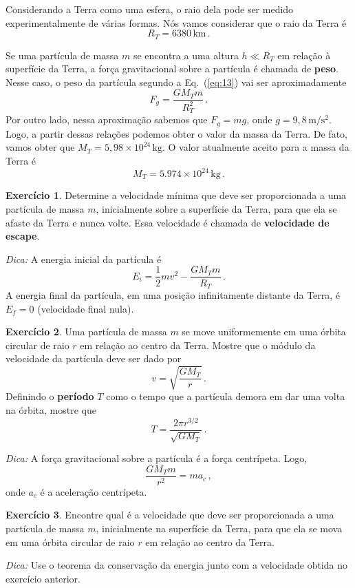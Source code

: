 \documentclass[12pt,a4paper]{article}
\theoremstyle{definition}
\newtheorem{ex}{Exercício}[section]
\begin{document}
Considerando a Terra como uma esfera, o raio dela pode ser medido
experimentalmente de várias formas. Nós vamos considerar que o raio da
Terra é
$$R_T=6380\,\mathrm{km}\,.$$

Se uma partícula de massa $m$ se encontra a uma altura $h\ll R_T$ em
relação à superfície da Terra, a força gravitacional sobre a partícula
é chamada de \textbf{peso}. Nesse caso, o peso da partícula segundo a
Eq.~(\ref{eq:13}) vai ser aproximadamente
$$F_g=\frac{GM_Tm}{R_T^2}\,.$$
Por outro lado, nessa aproximação sabemos que $F_g=mg$, onde
$g=9{,}8\,\mathrm{m}/\mathrm{s}^2$. Logo, a partir dessas relações
podemos obter o valor da massa da Terra. De fato, vamos obter que
$M_T=5{,}98\times 10^{24}\,\mathrm{kg}$. O valor atualmente aceito
para a massa da Terra é
$$M_T=5.974\times 10^{24}\,\mathrm{kg}\,.$$

\begin{ex}
  Determine a velocidade mí\-ni\-ma que deve ser proporcionada a uma
  partícula de massa $m$, inicialmente sobre a superfície da Terra,
  para que ela se afaste da Terra e nunca volte. Essa velocidade é
  chamada de \textbf{velocidade de escape}.

  \noindent\textit{Dica:} A energia inicial da partícula é
  $$E_i=\frac{1}{2}mv^2-\frac{GM_Tm}{R_T}\,.$$
  A energia final da partícula, em uma posição infinitamente distante
  da Terra, é $E_f=0$ (velocidade final nula).
\end{ex}

\begin{ex}
  Uma partícula de massa $m$ se move uniformemente em uma órbita
  circular de raio $r$ em relação ao centro da Terra. Mostre que o
  módulo da velocidade da partícula deve ser dado por
  $$v=\sqrt{\frac{GM_T}{r}}\,.$$
  Definindo o \textbf{período} $T$ como o tempo que a partícula demora
  em dar uma volta na órbita, mostre que
  $$T=\frac{2\pi r^{3/2}}{\sqrt{GM_T}}\,.$$

  \noindent\textit{Dica:} A força gravitacional sobre a partícula é a
  força centrípeta. Logo,
  $$\frac{GM_Tm}{r^2}=ma_c\,,$$
  onde $a_c$ é a aceleração centrípeta.
\end{ex}

\begin{ex}
  Encontre qual é a velocidade que deve ser proporcionada a uma
  partícula de massa $m$, inicialmente na superfície da Terra, para
  que ela se mova em uma órbita circular de raio $r$ em relação ao
  centro da Terra.

  \noindent\textit{Dica:} Use o teorema da conservação da energia
  junto com a velocidade obtida no exercício anterior.
\end{ex}
\end{document}
